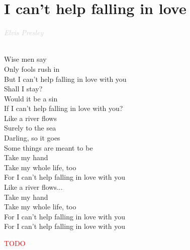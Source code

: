 \documentclass[a5paper, 10pt]{book}
\begin{document}
\section{I can't help falling in love}\textcolor{lightgray}{\textit{Elvis Presley}}\\~\\
\begin{minipage}[t]{0.8\textwidth}
Wise men say\\
Only fools rush in\\
But I can't help falling in love with you\\

Shall I stay?\\
Would it be a sin\\
If I can't help falling in love with you?\\

Like a river flows\\
Surely to the sea\\
Darling, so it goes\\
Some things are meant to be\\

Take my hand\\
Take my whole life, too\\
For I can't help falling in love with you\\

Like a river flows...\\

Take my hand\\
Take my whole life, too\\
For I can't help falling in love with you\\
For I can't help falling in love with you\\
\end{minipage}
\begin{minipage}[t]{0.2\textwidth}
\textcolor{red}{TODO}\\
\end{minipage}

\newpage
\end{document}
